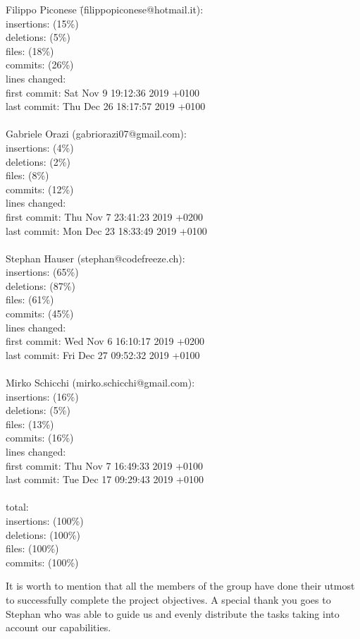 \begin{tabbing}
  Filippo Piconese \= (filippopiconese@hotmail.it):\\
  insertions:  (15\%)\\
  deletions:  (5\%)\\
  files:  (18\%)\\
  commits:  (26\%)\\
  lines changed: \\
  first commit: \> Sat Nov 9 19:12:36 2019 +0100\\
  last commit: \> Thu Dec 26 18:17:57 2019 +0100\\
  \\
  Gabriele Orazi \> (gabriorazi07@gmail.com):\\
  insertions:  (4\%)\\
  deletions:  (2\%)\\
  files:  (8\%)\\
  commits:  (12\%)\\
  lines changed: \\
  first commit: \> Thu Nov 7 23:41:23 2019 +0200\\
  last commit: \> Mon Dec 23 18:33:49 2019 +0100\\
  \\
  Stephan Hauser \> (stephan@codefreeze.ch):\\
  insertions:  (65\%)\\
  deletions:  (87\%)\\
  files:  (61\%)\\
  commits:  (45\%)\\
  lines changed: \\
  first commit: \> Wed Nov 6 16:10:17 2019 +0200\\
  last commit: \> Fri Dec 27 09:52:32 2019 +0100\\
  \\
  Mirko Schicchi \> (mirko.schicchi@gmail.com):\\
  insertions:  (16\%)\\
  deletions:  (5\%)\\
  files:  (13\%)\\
  commits:  (16\%)\\
  lines changed: \\
  first commit: \> Thu Nov 7 16:49:33 2019 +0100\\
  last commit: \> Tue Dec 17 09:29:43 2019 +0100\\
  \\
  total:\\
  insertions:  (100\%)\\
  deletions:  (100\%)\\
  files:  (100\%)\\
  commits:  (100\%)\\
\end{tabbing}
It is worth to mention that all the members of the group have done their utmost to successfully complete the project objectives.\newline
A special thank you goes to Stephan who was able to guide us and evenly distribute the tasks taking into account our capabilities.
